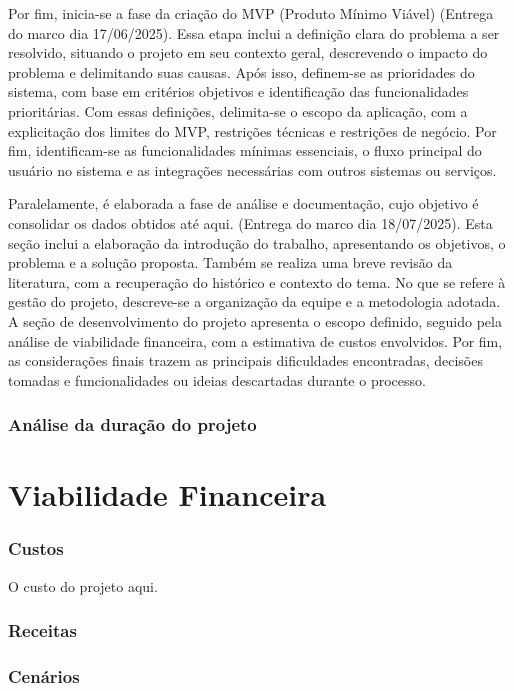\documentclass[
	12pt,				%
	openright,			%
	twoside,			%
	a4paper,			%
	english,			%
	french,				%
	spanish,			%
	brazil				%
	]{abntex2}
\begin{document}
Por fim, inicia-se a fase da criação do MVP (Produto Mínimo Viável) (Entrega do marco dia 17/06/2025). Essa etapa inclui a definição clara do problema a ser resolvido, situando o projeto em seu contexto geral, descrevendo o impacto do problema e delimitando suas causas. Após isso, definem-se as prioridades do sistema, com base em critérios objetivos e identificação das funcionalidades prioritárias. Com essas definições, delimita-se o escopo da aplicação, com a explicitação dos limites do MVP, restrições técnicas e restrições de negócio. Por fim, identificam-se as funcionalidades mínimas essenciais, o fluxo principal do usuário no sistema e as integrações necessárias com outros sistemas ou serviços.

Paralelamente, é elaborada a fase de análise e documentação, cujo objetivo é consolidar os dados obtidos até aqui. (Entrega do marco dia 18/07/2025). Esta seção inclui a elaboração da introdução do trabalho, apresentando os objetivos, o problema e a solução proposta. Também se realiza uma breve revisão da literatura, com a recuperação do histórico e contexto do tema. No que se refere à gestão do projeto, descreve-se a organização da equipe e a metodologia adotada. A seção de desenvolvimento do projeto apresenta o escopo definido, seguido pela análise de viabilidade financeira, com a estimativa de custos envolvidos. Por fim, as considerações finais trazem as principais dificuldades encontradas, decisões tomadas e funcionalidades ou ideias descartadas durante o processo.

\subsection{Análise da duração do projeto}

\chapter{Viabilidade Financeira}

\subsection{Custos}
O custo do projeto aqui.

\subsection{Receitas}

\subsection{Cenários}
\end{document}
